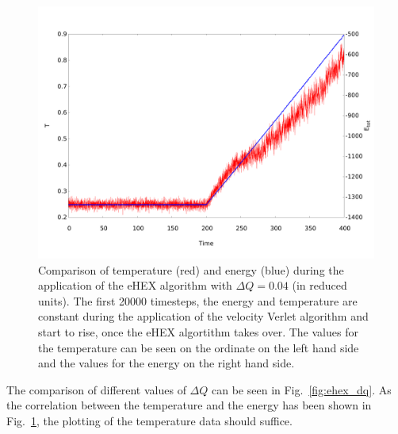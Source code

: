 \documentclass[12pt]{article}
\begin{document}
\begin{figure}[h]
    \begin{center}
        \includegraphics[scale=0.4]{images/ehex_te.pdf}
        \caption{Comparison of temperature (red) and energy (blue) during the application of the eHEX algorithm with $\Delta Q=0.04$ (in reduced units).
                The first 20000 timesteps, the energy and temperature are constant during the application of the velocity Verlet algorithm and start
            to rise, once the eHEX algortithm takes over. The values for the temperature can be seen on the ordinate on the left hand side
            and the values for the energy on the right hand side. }
        \label{fig:ehex_te}
    \end{center}
\end{figure}
The comparison of different values of $\Delta Q$ can be seen in Fig.~\ref{fig:ehex_dq}. As the correlation between the temperature and the energy has
been shown in Fig.~\ref{fig:ehex_te}, the plotting of the temperature data should suffice. 
\end{document}
